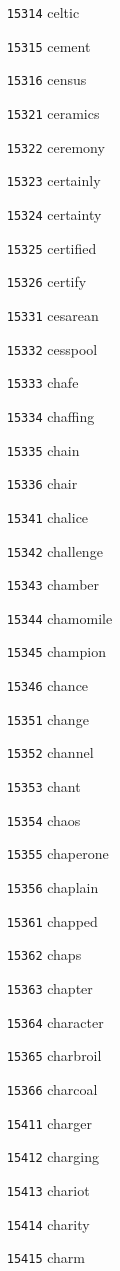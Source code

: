 \documentclass[twoside,11pt]{article}
\begin{document}
\begin{multicols}{5}
\begin{enumerate}
\item[\texttt{15314}] celtic
\item[\texttt{15315}] cement
\item[\texttt{15316}] census
\item[\texttt{15321}] ceramics
\item[\texttt{15322}] ceremony
\item[\texttt{15323}] certainly
\item[\texttt{15324}] certainty
\item[\texttt{15325}] certified
\item[\texttt{15326}] certify
\item[\texttt{15331}] cesarean
\item[\texttt{15332}] cesspool
\item[\texttt{15333}] chafe
\item[\texttt{15334}] chaffing
\item[\texttt{15335}] chain
\item[\texttt{15336}] chair
\item[\texttt{15341}] chalice
\item[\texttt{15342}] challenge
\item[\texttt{15343}] chamber
\item[\texttt{15344}] chamomile
\item[\texttt{15345}] champion
\item[\texttt{15346}] chance
\item[\texttt{15351}] change
\item[\texttt{15352}] channel
\item[\texttt{15353}] chant
\item[\texttt{15354}] chaos
\item[\texttt{15355}] chaperone
\item[\texttt{15356}] chaplain
\item[\texttt{15361}] chapped
\item[\texttt{15362}] chaps
\item[\texttt{15363}] chapter
\item[\texttt{15364}] character
\item[\texttt{15365}] charbroil
\item[\texttt{15366}] charcoal
\item[\texttt{15411}] charger
\item[\texttt{15412}] charging
\item[\texttt{15413}] chariot
\item[\texttt{15414}] charity
\item[\texttt{15415}] charm

\end{enumerate}
\end{multicols}
\end{document}
